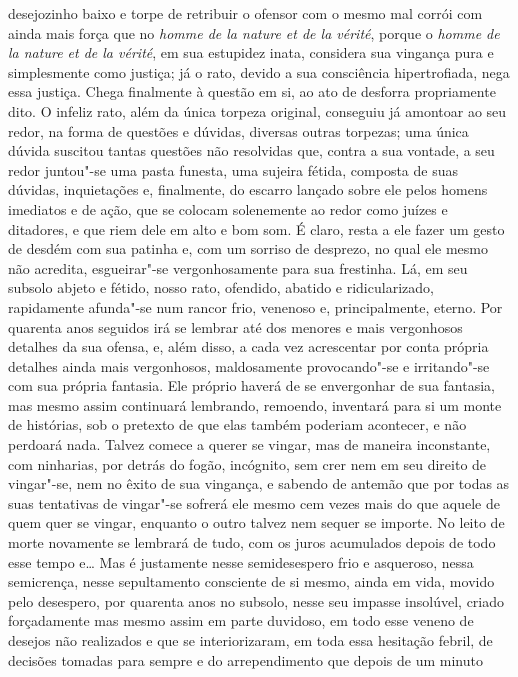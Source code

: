 desejozinho baixo e torpe de retribuir o ofensor com o mesmo mal corrói com
ainda mais força que no \textit{homme de la nature et de la vérité}, porque o
\textit{homme de la nature et de la vérité}, em sua estupidez inata, considera
sua vingança pura e simplesmente como justiça; já o rato, devido a sua
consciência hipertrofiada, nega essa justiça. Chega finalmente à questão em si,
ao ato de desforra propriamente dito. O infeliz rato, além da única torpeza
original, conseguiu já amontoar ao seu redor, na forma de questões e dúvidas,
diversas outras torpezas; uma única dúvida suscitou tantas questões não
resolvidas que, contra a sua vontade, a seu redor juntou"-se uma pasta funesta,
uma sujeira fétida, composta de suas dúvidas, inquietações e, finalmente, do
escarro lançado sobre ele pelos homens imediatos e de ação, que se colocam
solenemente ao redor como juízes e ditadores, e que riem dele em alto e bom
som. É claro, resta a ele fazer um gesto de desdém com sua patinha e, com um
sorriso de desprezo, no qual ele mesmo não acredita, esgueirar"-se
vergonhosamente para sua frestinha. Lá, em seu subsolo abjeto e fétido, nosso
rato, ofendido, abatido e ridicularizado, rapidamente afunda"-se num rancor
frio, venenoso e, principalmente, eterno. Por quarenta anos seguidos irá se
lembrar até dos menores e mais vergonhosos detalhes da sua ofensa, e, além
disso, a cada vez acrescentar por conta própria detalhes ainda mais
vergonhosos, maldosamente provocando"-se e irritando"-se com sua própria
fantasia. Ele próprio haverá de se envergonhar de sua fantasia, mas mesmo assim
continuará lembrando, remoendo, inventará para si um monte de histórias, sob o
pretexto de que elas também poderiam acontecer, e não perdoará nada. Talvez
comece a querer se vingar, mas de maneira inconstante, com ninharias, por
detrás do fogão, incógnito, sem crer nem em seu direito de vingar"-se, nem no
êxito de sua vingança, e sabendo de antemão que por todas as suas tentativas de
vingar"-se sofrerá ele mesmo cem vezes mais do que aquele de quem quer se
vingar, enquanto o outro talvez nem sequer se importe. No leito de morte
novamente se lembrará de tudo, com os juros acumulados depois de todo esse
tempo e\ldots{} Mas é justamente nesse semidesespero frio e asqueroso, nessa
semicrença, nesse sepultamento consciente de si mesmo, ainda em vida, movido
pelo desespero, por quarenta anos no subsolo, nesse seu impasse insolúvel,
criado forçadamente mas mesmo assim em parte duvidoso, em todo esse veneno de
desejos não realizados e que se interiorizaram, em toda essa hesitação febril,
de decisões tomadas para sempre e do arrependimento que depois de um minuto
